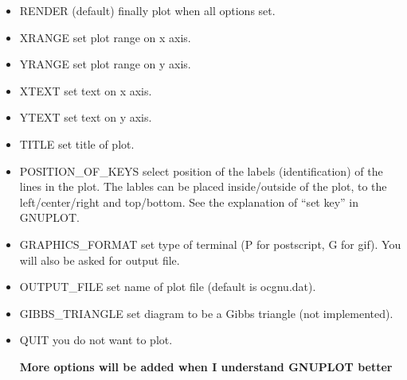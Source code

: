 \documentclass[12pt]{article}
\begin{document}
\begin{itemize}
  \begin{itemize}
  \item RENDER (default) finally plot when all options set.
  \item XRANGE set plot range on x axis.
  \item YRANGE set plot range on y axis.
  \item XTEXT set text on x axis.
  \item YTEXT set text on y axis.
  \item TITLE set title of plot.
  \item POSITION\_OF\_KEYS select position of the labels
    (identification) of the lines in the plot.  The lables can be
    placed inside/outside of the plot, to the left/center/right and
    top/bottom.  See the explanation of ``set key'' in GNUPLOT.
  \item GRAPHICS\_FORMAT set type of terminal (P for postscript, G for
    gif).  You will also be asked for output file.
  \item OUTPUT\_FILE set name of plot file (default is ocgnu.dat).
  \item GIBBS\_TRIANGLE set diagram to be a Gibbs triangle (not implemented).
  \item QUIT you do not want to plot.

    {\bf More options will be added when I understand GNUPLOT better}


\end{itemize}
\end{itemize}
\end{document}
